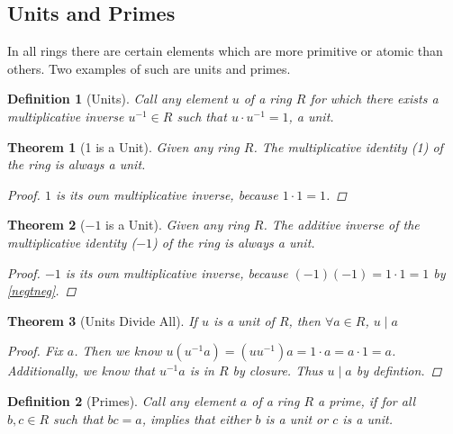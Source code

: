 \documentclass{article}
\newtheorem{thm}{Theorem}
\newtheorem*{defun}{Definition}
\begin{document}
  \subsection{Units and Primes}
  In all rings there are certain elements which are more primitive or atomic than others. Two examples of such are units and primes.
  \begin{defun} [Units] Call any element $u$ of a ring $R$ for which there exists a multiplicative inverse $u^{-1} \in R$ such that $u \cdot u^{-1} = 1$, a unit.
  \end{defun}
  \begin{thm} [1 is a Unit] Given any ring $R$. The multiplicative identity (1) of the ring is always a unit.
    \begin{proof}
      $1$ is its own multiplicative inverse, because $1 \cdot 1 = 1$.
    \end{proof}
  \end{thm}
  \begin{thm} [$-1$ is a Unit] Given any ring $R$. The additive inverse of the  multiplicative identity ($-1$) of the ring is always a unit.
    \begin{proof}
      $-1$ is its own multiplicative inverse, because $(-1)(-1) = 1 \cdot 1 = 1$ by \eqref{negtneg}.
    \end{proof}
  \end{thm}
  \begin{thm} [Units Divide All] \label{uda} If $u$ is a unit of $R$, then $\forall a \in R$, $u \mid a$  
    \begin{proof}
      Fix $a$. Then we know $u(u^{-1}a) = (uu^{-1})a = 1\cdot a = a\cdot 1 = a$. Additionally, we know that $u^{-1}a$ is in $R$ by closure. Thus $u \mid a$ by defintion.
    \end{proof}
  \end{thm}
  \begin{defun} [Primes] Call any element $a$ of a ring $R$ a prime, if for all $b, c \in R$ such that $bc = a$, implies that either $b$ is a unit or $c$ is a unit.
  \end{defun}
\end{document}
